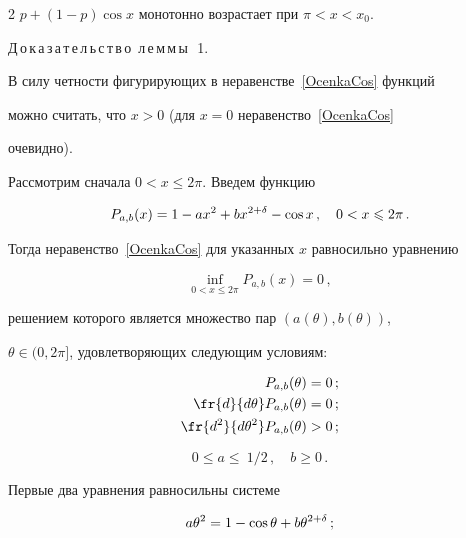 \begin{multicols}{2}
$p+(1-p)\cos x$ монотонно возрастает при $\pi< x< x_0$.



\medskip



\noindent

Д\,о\,к\,а\,з\,а\,т\,е\,л\,ь\,с\,т\,в\,о\ л\,е\,м\,м\,ы\,\ 1.\

В силу четности фигурирующих в неравенстве~\eqref{OcenkaCos} функций

можно считать, что $x>0$ (для $x=0$ неравенство~\eqref{OcenkaCos}

очевидно).



Рассмотрим сначала $0<x\le 2\pi.$ Введем функцию

$$

P_{a,b}(x)=1-ax^2+bx^{2+\d}-\cos x\,,\quad 0<x\le 2 \pi\,.

$$

Тогда неравенство~\eqref{OcenkaCos} для указанных $x$ равносильно уравнению

$$

\inf_{0< x\le2\pi} P_{a,b}(x)=0\,,

$$

решением которого является множество пар $(a(\theta),b(\theta))$,

${\theta\in(0,2\pi]}$, удовлетворяющих сле\-ду\-ющим условиям:

\begin{align*}

P_{a,b}(\theta)&=0\,;\\

\fr {d}{d\theta}P_{a,b}(\theta)&=0\,;\\

\fr {d^2}{d\theta^2}P_{a,b}(\theta)&>0\,;

\end{align*}

\vspace*{-6pt}



\noindent

$$

0 \le a \le\ 1/2\,,\quad b \ge0\,.

$$

Первые два уравнения равносильны системе

\begin{align}

a\theta^2&= 1-\cos\theta+b\theta^{2+\d}\,;

\label{CosANepolnoe}\\


\end{align}
\end{multicols}
